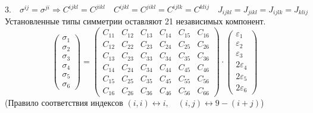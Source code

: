  
$
 3. \quad\sigma^{i j}=\sigma^{j i} \Rightarrow C^{i j k l}=C^{j i k l} \quad C^{i j k l}=C^{j i k l}=C^{i j l k}=C^{k l i j} \quad J_{i j k l}=J_{j i k l}=J_{i j l k}=J_{k l i j}
$
Установленные типы симметрии оставляют 21 независимых компонент.
$$
\left(\begin{array}{l}
\sigma_1 \\
\sigma_2 \\
\sigma_3 \\
\sigma_4 \\
\sigma_5 \\
\sigma_6
\end{array}\right)=\left(\begin{array}{llllll}
C_{11} & C_{12} & C_{13} & C_{14} & C_{15} & C_{16} \\
C_{12} & C_{22} & C_{23} & C_{24} & C_{25} & C_{26} \\
C_{13} & C_{23} & C_{33} & C_{34} & C_{35} & C_{36} \\
C_{14} & C_{24} & C_{34} & C_{44} & C_{45} & C_{46} \\
C_{15} & C_{25} & C_{35} & C_{45} & C_{55} & C_{56} \\
C_{16} & C_{26} & C_{36} & C_{46} & C_{56} & C_{66}
\end{array}\right) \cdot\left(\begin{array}{c}
\varepsilon_1 \\
\varepsilon_2 \\
\varepsilon_3 \\
2 \varepsilon_4 \\
2 \varepsilon_5 \\
2 \varepsilon_6
\end{array}\right)
$$
(Правило соответствия индексов $(i, i) \leftrightarrow i, \quad(i, j) \leftrightarrow 9-(i+j)$)


